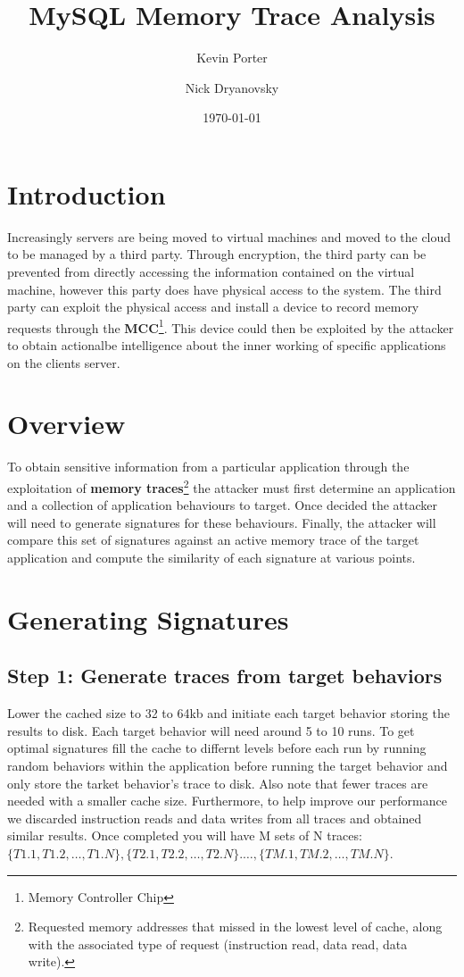 \documentclass[11pt,a4paper, titlepage, oneside]{article}
\begin{document}
\title{MySQL Memory Trace Analysis}
\author{Kevin Porter \and Nick Dryanovsky}
\date{\today}
\maketitle

\setcounter{section}{-1}
\section{Introduction}
Increasingly servers are being moved to virtual machines and moved to the cloud to be managed by a third party. Through encryption, the third party can be prevented from directly accessing the information contained on the virtual machine, however this party does have physical access to the system. The third party can exploit the physical access and install a device to record memory requests through the \textbf{MCC}\footnote[0]{Memory Controller Chip}. This device could then be exploited by the attacker to obtain actionalbe intelligence about the inner working of specific applications on the clients server.

\section{Overview}
To obtain sensitive information from a particular application through the exploitation of \textbf{memory traces}\footnote{Requested memory addresses that missed in the lowest level of cache, along with the associated type of request (instruction read, data read, data write).} the attacker must first determine an application and a collection of application behaviours to target.  Once decided the attacker will need to generate signatures for these behaviours. Finally, the attacker will compare this set of signatures against an active memory trace of the target application and compute the similarity of each signature at various points.

\section{Generating Signatures}
\subsection{Step 1: Generate traces from target behaviors}
Lower the cached size to 32 to 64kb and initiate each target behavior storing the results to disk.  Each target behavior will need around 5 to 10 runs. To get optimal signatures fill the cache to differnt levels before each run by running random behaviors within the application before running the target behavior and only store the tarket behavior's trace to disk.  Also note that fewer traces are needed with a smaller cache size. Furthermore, to help improve our performance we discarded instruction reads and data writes from all traces and obtained similar results.
Once completed you will have M sets of N traces: \\$\{T1.1, T1.2, \ldots, T1.N\}, \{T2.1, T2.2, \ldots, T2.N\}. \ldots, \{TM.1, TM.2, \ldots, TM.N\}$.
\end{document}
